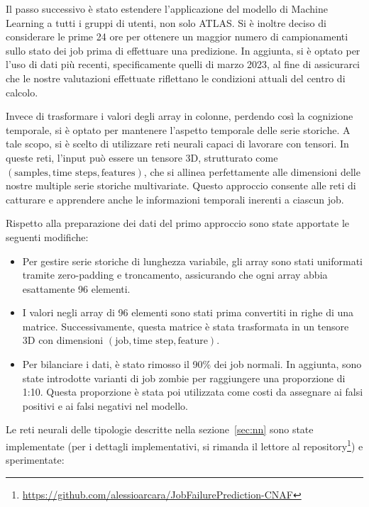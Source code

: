 Il passo successivo è stato estendere l'applicazione del modello di Machine
Learning a tutti i gruppi di utenti, non solo ATLAS. Si è inoltre deciso di
considerare le prime 24 ore per ottenere un maggior numero di campionamenti
sullo stato dei job prima di effettuare una predizione. In aggiunta, si è
optato per l'uso di dati più recenti, specificamente quelli di marzo 2023, al
fine di assicurarci che le nostre valutazioni effettuate riflettano le
condizioni attuali del centro di calcolo.

Invece di trasformare i valori degli array in colonne, perdendo così la
cognizione temporale, si è optato per mantenere l'aspetto temporale delle
serie storiche. A tale scopo, si è scelto di utilizzare reti neurali capaci di
lavorare con tensori. In queste reti, l'input può essere un tensore 3D,
strutturato come $(\text{samples},\text{time steps},\text{features})$, che si
allinea perfettamente alle dimensioni delle nostre multiple serie storiche
multivariate. Questo approccio consente alle reti di catturare e apprendere
anche le informazioni temporali inerenti a ciascun job.

Rispetto alla preparazione dei dati del primo approccio sono state apportate
le seguenti modifiche:
\begin{itemize}
    \item Per gestire serie storiche di lunghezza variabile, gli array sono
        stati uniformati tramite zero-padding e troncamento, assicurando che
        ogni array abbia esattamente 96 elementi.
    \item I valori negli array di 96 elementi sono stati prima convertiti in
        righe di una matrice. Successivamente, questa matrice è stata
        trasformata in un tensore 3D con dimensioni $(\text{job},\text{time
        step},\text{feature})$.
    \item Per bilanciare i dati, è stato rimosso il 90\% dei job normali. In
        aggiunta, sono state introdotte varianti di job zombie per raggiungere
        una proporzione di 1:10. Questa proporzione è stata poi utilizzata
        come costi da assegnare ai falsi positivi e ai falsi negativi nel
        modello.
\end{itemize}

Le reti neurali delle tipologie descritte nella sezione~\ref{sec:nn} sono
state implementate (per i dettagli implementativi, si rimanda il lettore al
repository\footnote{\url{https://github.com/alessioarcara/JobFailurePrediction-CNAF}})
e sperimentate:

